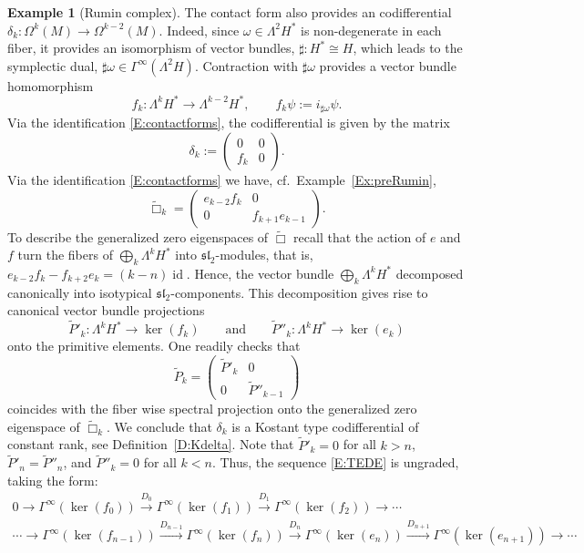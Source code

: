 \documentclass[reqno,12pt]{amsart}
\DeclareMathOperator{\id}{id}
\theoremstyle{plain}
\theoremstyle{definition}
\newtheorem{example}[theorem]{Example}
\begin{document}
\begin{example}[Rumin complex]
The contact form also provides an codifferential $\delta_k\colon\Omega^k(M)\to\Omega^{k-2}(M)$.
Indeed, since $\omega\in\Lambda^2H^*$ is non-degenerate in each fiber, it provides an isomorphism of vector bundles, $\sharp\colon H^*\cong H$, which leads to the symplectic dual, $\sharp\omega\in\Gamma^\infty(\Lambda^2H)$. 
Contraction with $\sharp\omega$ provides a vector bundle homomorphism 
$$
f_k\colon\Lambda^kH^*\to\Lambda^{k-2}H^*,\qquad f_k\psi:=i_{\sharp\omega}\psi.
$$
Via the identification \eqref{E:contactforms}, the codifferential is given by the matrix
$$
\delta_k:=\begin{pmatrix}0&0\\f_k&0\end{pmatrix}.
$$
Via the identification \eqref{E:contactforms} we have, cf.\ Example~\ref{Ex:preRumin},
$$
\tilde\Box_k=\begin{pmatrix}e_{k-2}f_k&0\\0&f_{k+1}e_{k-1}\end{pmatrix}.
$$
To describe the generalized zero eigenspaces of $\tilde\Box$ recall that the action of $e$ and $f$ turn the fibers of $\bigoplus_k\Lambda^kH^*$ into $\mathfrak s\mathfrak l_2$-modules, that is, $e_{k-2}f_k-f_{k+2}e_k=(k-n)\id$.
Hence, the vector bundle $\bigoplus_k\Lambda^kH^*$ decomposed canonically into isotypical $\mathfrak s\mathfrak l_2$-components. This decomposition gives rise to canonical vector bundle projections 
$$
\tilde P'_k\colon\Lambda^kH^*\to\ker(f_k)
\qquad\text{and}\qquad
\tilde P''_k\colon\Lambda^kH^*\to\ker(e_k)
$$ 
onto the primitive elements.
One readily checks that 
$$
\tilde P_k=\begin{pmatrix}\tilde P'_k&0\\0&\tilde P''_{k-1}\end{pmatrix}
$$
coincides with the fiber wise spectral projection onto the generalized zero eigenspace of $\tilde\Box_k$.
We conclude that $\delta_k$ is a Kostant type codifferential of constant rank, see Definition~\ref{D:Kdelta}.
Note that $\tilde P'_k=0$ for all $k>n$, $\tilde P'_n=\tilde P''_n$, and $\tilde P''_k=0$ for all $k<n$.
Thus, the sequence \eqref{E:TEDE} is ungraded, taking the form:
\begin{multline}\label{E:RuminD}
0\to\Gamma^\infty(\ker(f_0))\xrightarrow{D_0}
\Gamma^\infty(\ker(f_1))\xrightarrow{D_1}
\Gamma^\infty(\ker(f_2))\to\cdots
\\
\cdots\to\Gamma^\infty(\ker(f_{n-1}))\xrightarrow{D_{n-1}}
\Gamma^\infty(\ker(f_n))\xrightarrow{D_n}
\Gamma^\infty(\ker(e_n))\xrightarrow{D_{n+1}}
\Gamma^\infty(\ker(e_{n+1}))\to\cdots

\end{multline}
\end{example}
\end{document}
